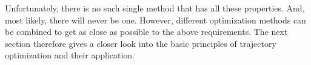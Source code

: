 Unfortunately, there is no such single method that has all these properties. And, most likely, there will never be one. However, different optimization methods can be combined to get as close as possible to the above requirements. The next section therefore gives a closer look into the basic principles of trajectory optimization and their application.


